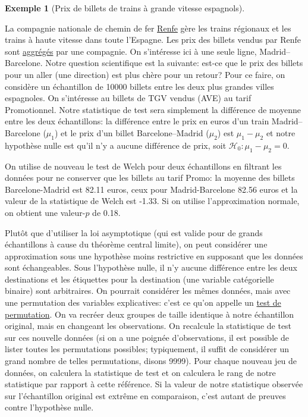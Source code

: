 \documentclass[
  11pt,
  letterpaper,
]{scrbook}
\theoremstyle{plain}
\theoremstyle{plain}
\theoremstyle{definition}
\newtheorem{example}{Exemple}[chapter]
\theoremstyle{definition}
\theoremstyle{remark}
\begin{document}
\begin{example}[Prix de billets de trains à grande vitesse
espagnols]\protect\hypertarget{exm-prix-trains-tests}{}\label{exm-prix-trains-tests}

La compagnie nationale de chemin de fer
\href{https://www.renfe.com/}{Renfe} gère les trains régionaux et les
trains à haute vitesse dans toute l'Espagne. Les prix des billets vendus
par Renfe sont
\href{https://www.kaggle.com/thegurusteam/spanish-high-speed-rail-system-ticket-pricing}{aggrégés}
par une compagnie. On s'intéresse ici à une seule ligne,
Madrid--Barcelone. Notre question scientifique est la suivante: est-ce
que le prix des billets pour un aller (une direction) est plus chère
pour un retour? Pour ce faire, on considère un échantillon de 10000
billets entre les deux plus grandes villes espagnoles. On s'intéresse au
billets de TGV vendus (AVE) au tarif Promotionnel. Notre statistique de
test sera simplement la différence de moyenne entre les deux
échantillons: la différence entre le prix en euros d'un train
Madrid--Barcelone (\(\mu_1\)) et le prix d'un billet Barcelone--Madrid
(\(\mu_2\)) est \(\mu_1-\mu_2\) et notre hypothèse nulle est qu'il n'y a
aucune différence de prix, soit \(\mathscr{H}_0: \mu_1-\mu_2=0.\)

On utilise de nouveau le test de Welch pour deux échantillons en
filtrant les données pour ne conserver que les billets au tarif Promo:
la moyenne des billets Barcelone-Madrid est 82.11 euros, ceux pour
Madrid-Barcelone 82.56 euros et la valeur de la statistique de Welch est
-1.33. Si on utilise l'approximation normale, on obtient une
valeur-\(p\) de 0.18.

Plutôt que d'utiliser la loi asymptotique (qui est valide pour de grands
échantillons à cause du théorème central limite), on peut considérer une
approximation sous une hypothèse moins restrictive en supposant que les
données sont échangeables. Sous l'hypothèse nulle, il n'y aucune
différence entre les deux destinations et les étiquettes pour la
destination (une variable catégorielle binaire) sont arbitraires. On
pourrait considérer les mêmes données, mais avec une permutation des
variables explicatives: c'est ce qu'on appelle un
\href{https://www.jwilber.me/permutationtest/}{test de permutation}. On
va recréer deux groupes de taille identique à notre échantillon
original, mais en changeant les observations. On recalcule la
statistique de test sur ces nouvelle données (si on a une poignée
d'observations, il est possible de lister toutes les permutations
possibles; typiquement, il suffit de considérer un grand nombre de
telles permutations, disons 9999). Pour chaque nouveau jeu de données,
on calculera la statistique de test et on calculera le rang de notre
statistique par rapport à cette référence. Si la valeur de notre
statistique observée sur l'échantillon original est extrême en
comparaison, c'est autant de preuves contre l'hypothèse nulle.


\end{example}
\end{document}
